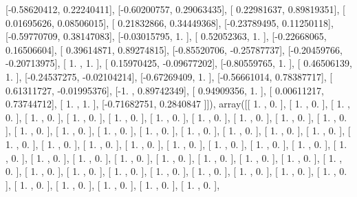 \documentclass{article}
\begin{document}
       [-0.58620412,  0.22240411],
       [-0.60200757,  0.29063435],
       [ 0.22981637,  0.89819351],
       [ 0.01695626,  0.08506015],
       [ 0.21832866,  0.34449368],
       [-0.23789495,  0.11250118],
       [-0.59770709,  0.38147083],
       [-0.03015795,  1.        ],
       [ 0.52052363,  1.        ],
       [-0.22668065,  0.16506604],
       [ 0.39614871,  0.89274815],
       [-0.85520706, -0.25787737],
       [-0.20459766, -0.20713975],
       [ 1.        ,  1.        ],
       [ 0.15970425, -0.09677202],
       [-0.80559765,  1.        ],
       [ 0.46506139,  1.        ],
       [-0.24537275, -0.02104214],
       [-0.67269409,  1.        ],
       [-0.56661014,  0.78387717],
       [ 0.61311727, -0.01995376],
       [-1.        ,  0.89742349],
       [ 0.94909356,  1.        ],
       [ 0.00611217,  0.73744712],
       [ 1.        ,  1.        ],
       [-0.71682751,  0.2840847 ]]), array([[ 1.        ,  0.        ],
       [ 1.        ,  0.        ],
       [ 1.        ,  0.        ],
       [ 1.        ,  0.        ],
       [ 1.        ,  0.        ],
       [ 1.        ,  0.        ],
       [ 1.        ,  0.        ],
       [ 1.        ,  0.        ],
       [ 1.        ,  0.        ],
       [ 1.        ,  0.        ],
       [ 1.        ,  0.        ],
       [ 1.        ,  0.        ],
       [ 1.        ,  0.        ],
       [ 1.        ,  0.        ],
       [ 1.        ,  0.        ],
       [ 1.        ,  0.        ],
       [ 1.        ,  0.        ],
       [ 1.        ,  0.        ],
       [ 1.        ,  0.        ],
       [ 1.        ,  0.        ],
       [ 1.        ,  0.        ],
       [ 1.        ,  0.        ],
       [ 1.        ,  0.        ],
       [ 1.        ,  0.        ],
       [ 1.        ,  0.        ],
       [ 1.        ,  0.        ],
       [ 1.        ,  0.        ],
       [ 1.        ,  0.        ],
       [ 1.        ,  0.        ],
       [ 1.        ,  0.        ],
       [ 1.        ,  0.        ],
       [ 1.        ,  0.        ],
       [ 1.        ,  0.        ],
       [ 1.        ,  0.        ],
       [ 1.        ,  0.        ],
       [ 1.        ,  0.        ],
       [ 1.        ,  0.        ],
       [ 1.        ,  0.        ],
       [ 1.        ,  0.        ],
       [ 1.        ,  0.        ],
       [ 1.        ,  0.        ],
       [ 1.        ,  0.        ],
       [ 1.        ,  0.        ],
       [ 1.        ,  0.        ],
       [ 1.        ,  0.        ],
       [ 1.        ,  0.        ],
       [ 1.        ,  0.        ],
       [ 1.        ,  0.        ],
       [ 1.        ,  0.        ],
\end{document}
